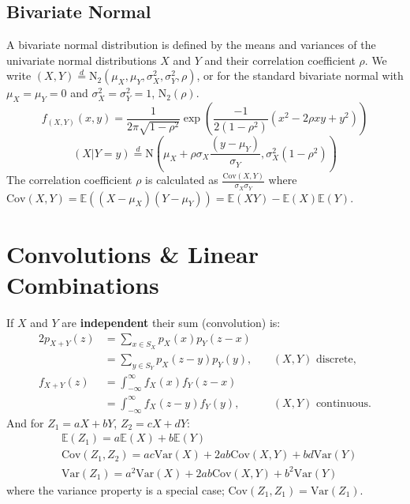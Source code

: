 \documentclass[titlepage,twocolumn]{article}
\begin{document}
\subsection*{Bivariate Normal}
A bivariate normal distribution is defined by the means and variances of the univariate normal distributions $X$ and $Y$ and their correlation coefficient $\rho$. We write $(X,Y) \stackrel{d}{=} \mbox{N}_{2}(\mu_X, \mu_Y, \sigma^2_X, \sigma^2_Y, \rho)$, or for the standard bivariate normal with $\mu_X = \mu_Y = 0$ and $\sigma^2_X = \sigma^2_Y = 1$, $\mbox{N}_{2}(\rho)$.
$$
f_{(X,Y)}(x,y)=\frac{1}{2 \pi \sqrt{1 - \rho^2}}\exp{\left(\frac{-1}{2(1-\rho^2)}(x^2 - 2 \rho x y + y^2)\right)}$$ $$
(X|Y=y) \stackrel{d}{=} \mbox{N}(\mu_X + \rho \sigma_X \frac{(y-\mu_Y)}{\sigma_Y}, \sigma_X^2(1-\rho^2))
$$
The correlation coefficient $\rho$ is calculated as $\frac{\mbox{Cov}(X,Y)}{\sigma_X \sigma_Y}$ where $\mbox{Cov}(X,Y) = \mathbb{E}((X-\mu_X)(Y-\mu_Y)) = \mathbb{E}(XY) - \mathbb{E}(X)\mathbb{E}(Y)$.

\section*{Convolutions \& Linear Combinations}
If $X$ and $Y$ are \textbf{independent} their sum (convolution) is:
\begin{alignat*}{2}
    p_{X+Y}(z) &= \sum_{x \in S_X} p_X(x)p_Y(z-x)\\
               &= \sum_{y \in S_Y} p_X(z-y)p_Y(y), &&\ (X,Y) \mbox{ discrete,}\\
    f_{X+Y}(z) &= \int_{-\infty}^{\infty} f_X(x)f_Y(z-x)\\
               &= \int_{-\infty}^{\infty} f_X(z-y)f_Y(y), &&\ (X,Y) \mbox{ continuous.}
\end{alignat*}
And for $Z_1 = aX+bY$, $Z_2 = cX+dY$:
\begin{align*}
    &\mathbb{E}(Z_1) = a\mathbb{E}(X) + b\mathbb{E}(Y)\\
    &\mbox{Cov}(Z_1, Z_2) = ac \mbox{Var}(X) + 2ab \mbox{Cov}(X,Y) + bd \mbox{Var}(Y)\\
    &\mbox{Var}(Z_1) = a^2 \mbox{Var}(X) + 2ab \mbox{Cov}(X,Y) + b^2 \mbox{Var}(Y)
\end{align*}
where the variance property is a special case; $\mbox{Cov}(Z_1, Z_1) = \mbox{Var}(Z_1)$.
\end{document}
